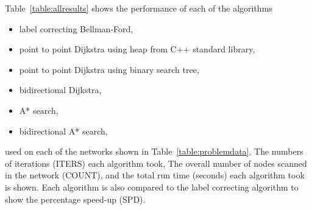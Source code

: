 Table~\ref{table:allresults} shows the performance of each of the algorithms
\begin{itemize}
    \item label correcting Bellman-Ford,
    \item point to point Dijkstra using heap from C++ standard library,
    \item point to point Dijkstra using binary search tree,
    \item bidirectional Dijkstra,
    \item A* search,
    \item bidirectional A* search,
\end{itemize}
used on each of the networks shown in Table~\ref{table:problemdata}.
The numbers of iterations (ITERS) each algorithm took,
The overall number of nodes scanned in the network (COUNT),
and the total run time (seconds) each algorithm took is shown.
Each algorithm is also compared to the label correcting algorithm to show the percentage speed-up (SPD).

